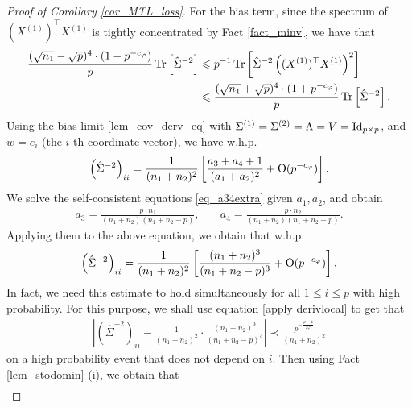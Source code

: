 \begin{proof}[Proof of Corollary \ref{cor_MTL_loss}]
For the bias term, since the spectrum of $(X^{(1)})^{\top} X^{(1)}$ is tightly concentrated by Fact \ref{fact_minv}, we have that
\begin{align}
 \frac{(\sqrt{n_1}-\sqrt{p})^4 \cdot (1- p^{-c_\varphi})}{p} \operatorname{Tr}\left[\hat \Sigma^{-2}\right]  &\leqslant {p}^{-1}\operatorname{Tr}\left[\hat\Sigma^{-2} \left((X^{(1)})^\top X^{(1)} \right)^2\right] \label{eq_bias111}\\
 &\leqslant \frac{(\sqrt{n_1}+\sqrt{p})^4 \cdot (1+ p^{-c_\varphi})}{p} \operatorname{Tr}\left[\hat\Sigma^{-2}\right].\nonumber
\end{align}
Using the bias limit \eqref{lem_cov_derv_eq} with $\Sigma^{(1)}=\Sigma^{(2)}=\Lambda=V=\operatorname{Id}_{p\times p}$, and $w = e_i$ (the $i$-th coordinate vector), we have w.h.p.
\begin{align*}%
 \left(\hat\Sigma^{-2}\right)_{ii} = \frac{1}{(n_1+n_2)^2} \left[\frac{a_3+a_4+1}{(a_1+a_2)^2} +\OO(p^{-c_\varphi})\right].
\end{align*}
We solve the self-consistent equations \eqref{eq_a34extra} given $a_1, a_2$, and obtain
	\begin{align*}
		a_3 = \frac{p\cdot n_1}{(n_1 +n_2)(n_1 +n_2 - p)}, \quad
		&  a_4 = \frac{p\cdot n_2}{(n_1 + n_2)(n_1 + n_2 - p)}. %
	\end{align*}
Applying them to the above equation, we obtain that w.h.p.
\begin{align*}%
 \left(\hat\Sigma^{-2}\right)_{ii} =  \frac{1}{(n_1+n_2)^2} \left[  \frac{ (n_1+n_2)^3 }{(n_1+n_2-p)^3} +\OO(p^{-c_\varphi})\right].
\end{align*}
In fact, we need this estimate to hold simultaneously for all $1\le i \le p$ with high probability. For this purpose, we shall use equation \eqref{apply derivlocal} to get that
\begin{align*}%
\left| \left(\hat\Sigma^{-2}\right)_{ii} - \frac{1}{(n_1+n_2)^2}\cdot \frac{(n_1+n_2)^3}{(n_1+n_2-p)^3}\right|\prec \frac{p^{-\frac{\varphi-4}{2\varphi}}}{(n_1+n_2)^2}
\end{align*}
on a high probability event that does not depend on $i$. Then using Fact \ref{lem_stodomin} (i), we obtain that 
\begin{align*} 

\end{align*}
\end{proof}

